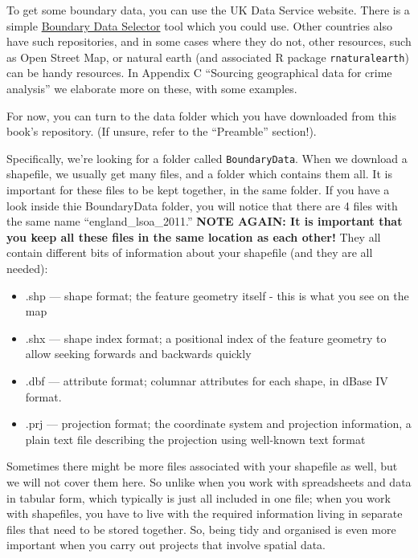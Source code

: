 \documentclass[
]{book}
\providecommand{\tightlist}{%
  \setlength{\itemsep}{0pt}\setlength{\parskip}{0pt}}
\begin{document}
To get some boundary data, you can use the UK Data Service website. There is a simple \href{https://borders.ukdataservice.ac.uk/bds.html}{Boundary Data Selector} tool which you could use. Other countries also have such repositories, and in some cases where they do not, other resources, such as Open Street Map, or natural earth (and associated R package \texttt{rnaturalearth}) can be handy resources. In Appendix C ``Sourcing geographical data for crime analysis'' we elaborate more on these, with some examples.

For now, you can turn to the data folder which you have downloaded from this book's repository. (If unsure, refer to the ``Preamble'' section!).

Specifically, we're looking for a folder called \texttt{BoundaryData}. When we download a shapefile, we usually get many files, and a folder which contains them all. It is important for these files to be kept together, in the same folder. If you have a look inside thie BoundaryData folder, you will notice that there are 4 files with the same name ``england\_lsoa\_2011.'' \textbf{NOTE AGAIN: It is important that you keep all these files in the same location as each other!} They all contain different bits of information about your shapefile (and they are all needed):

\begin{itemize}
\tightlist
\item
  .shp --- shape format; the feature geometry itself - this is what you see on the map
\item
  .shx --- shape index format; a positional index of the feature geometry to allow seeking forwards and backwards quickly
\item
  .dbf --- attribute format; columnar attributes for each shape, in dBase IV format.
\item
  .prj --- projection format; the coordinate system and projection information, a plain text file describing the projection using well-known text format
\end{itemize}

Sometimes there might be more files associated with your shapefile as well, but we will not cover them here. So unlike when you work with spreadsheets and data in tabular form, which typically is just all included in one file; when you work with shapefiles, you have to live with the required information living in separate files that need to be stored together. So, being tidy and organised is even more important when you carry out projects that involve spatial data.
\end{document}
